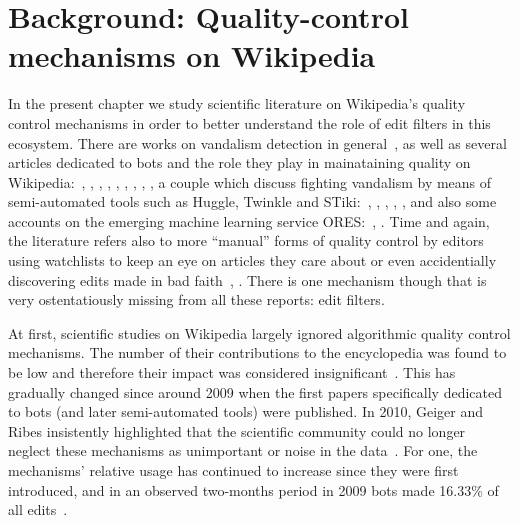 \chapter{Background: Quality-control mechanisms on Wikipedia}
\label{chap:background}

In the present chapter we study scientific literature on Wikipedia's quality control mechanisms in order to better understand the role of edit filters in this ecosystem.
There are works on vandalism detection in general~\cite{PotSteGer2008},
as well as several articles dedicated to bots and the role they play in mainataining quality on Wikipedia:~\cite{GeiHal2013}, \cite{Geiger2014}, \cite{GeiHal2017}, \cite{GeiRib2010}, \cite{HalRied2012}, \cite{Livingstone2016}, \cite{MueDoHer2013}, \cite{MuellerBirn2014}, \cite{Geiger2009},
a couple which discuss fighting vandalism by means of semi-automated tools such as Huggle, Twinkle and STiki:~\cite{GeiRib2010}, \cite{HalRied2012}, \cite{WestKanLee2010}, \cite{GeiHal2013}, \cite{Geiger2009},
and also some accounts on the emerging machine learning service ORES:~\cite{HalTar2015}, \cite{HalGeiMorSarWig2018}.
Time and again, the literature refers also to more ``manual'' forms of quality control by editors using watchlists to keep an eye on articles they care about or even accidentially discovering edits made in bad faith~\cite{Livingstone2016}, \cite{AstHal2018}.
There is one mechanism though that is very ostentatiously missing from all these reports: edit filters.

At first, scientific studies on Wikipedia largely ignored algorithmic quality control mechanisms.
The number of their contributions to the encyclopedia was found to be low and therefore their impact was considered insignificant~\cite{KitChiBrySuhMyt2007}.
This has gradually changed since around 2009 when the first papers specifically dedicated to bots (and later semi-automated tools) were published.
In 2010, Geiger and Ribes insistently highlighted that the scientific community could no longer neglect these mechanisms as unimportant or noise in the data~\cite{GeiRib2010}.
For one, the mechanisms' relative usage has continued to increase since they were first introduced, and in an observed two-months period in 2009 bots made 16.33\% of all edits~\cite{Geiger2009}.

